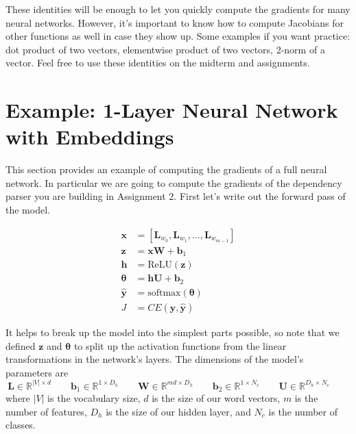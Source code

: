\documentclass{article}[11pt]
\newcommand{\bW} { \bm{W} }
\newcommand{\bU} { \bm{U} }
\newcommand{\bb} { \bm{b} }
\newcommand{\bz} { \bm{z} }
\newcommand{\bx} { \bm{x} }
\newcommand{\by} { \bm{y} }
\newcommand{\yhat} { \bm{\hat{y}} }
\newcommand{\btheta} { \bm{\theta} }
\newcommand{\bh} { \bm{h} }
\newcommand{\bL} { \bm{L} }
\newcommand{\smx} { \text{softmax} }
\newcommand{\relu} { \text{ReLU} }
\newcommand{\alns}[1] {
	\begin{align*} #1 \end{align*}
}
\newcommand{\pd}[2] {
 \frac{\partial #1}{\partial #2}
}
\begin{document}
\begin{enumerate}[(1)]


\end{enumerate}

These identities will be enough to let you quickly compute the gradients for many neural networks. However, it's important to know how to compute Jacobians for other functions as well in case they show up. Some examples if you want practice: dot product of two vectors, elementwise product of two vectors, 2-norm of a vector. Feel free to use these identities on the midterm and assignments. 

\section{Example: 1-Layer Neural Network with Embeddings}
This section provides an example of computing the gradients of a full neural network.
In particular we are going to compute the gradients of the dependency parser you are building in Assignment 2. First let's write out the forward pass of the model.
\alns{
	\bx &= [\bL_{w_0}, \bL_{w_1}, ..., \bL_{w_{m - 1} }]  \\
	\bz &= \bx \bW + \bb_1 \\
	\bh &= \relu(\bz) \\
	\btheta &= \bh \bU + \bb_2 \\
	\yhat &= \smx(\btheta) \\
	J &= CE(\by, \yhat)
}
It helps to break up the model into the simplest parts possible, so note that we defined $\bz$ and $\btheta$ to split up the activation functions from the linear transformations in the network's layers. The dimensions of the model's parameters are 
\[
\bL \in \mathbb{R}^{|V| \times d} \quad\quad
\bb_1 \in \mathbb{R}^{1 \times D_h} \quad\quad
\bW \in \mathbb{R}^{md \times D_h} \quad\quad
\bb_2 \in \mathbb{R}^{1 \times N_c} \quad\quad
\bU \in \mathbb{R}^{D_h \times N_c} \quad\quad
\]
where $|V|$ is the vocabulary size, $d$ is the size of our word vectors, $m$ is the number of features, $D_h$ is the size of our hidden layer, and $N_c$ is the number of classes. \\
\end{document}
